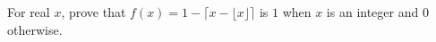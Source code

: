 For real $x$, prove that $f(x)=1-\lceil x-\lfloor x\rfloor\rceil$ is $1$ when $x$ is an integer and $0$ otherwise.
